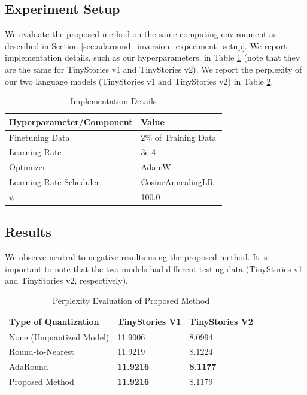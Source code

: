 \documentclass[../main.tex]{subfiles}
\begin{document}
\subsection{Experiment Setup}
We evaluate the proposed method on the same computing environment as described in Section \ref{sec:adaround_inversion_experiment_setup}. We report implementation details, such as our hyperparameters, in Table \ref{tab:implementation_detail_2} (note that they are the same for TinyStories v1 and TinyStories v2). We report the perplexity of our two language models (TinyStories v1 and TinyStories v2) in Table \ref{tab:gradient_aware_adaround_results}. 

\begin{table}[H]
\centering
\caption{Implementation Details}
\label{tab:implementation_detail_2}
\begin{tabular}{ll}
\hline
\textbf{Hyperparameter/Component} & \textbf{Value} \\ \hline
Finetuning Data & $2\%$ of Training Data \\
Learning Rate & 3e-4 \\
Optimizer & AdamW~\cite{loshchilovDecoupledWeightDecay2019} \\
Learning Rate Scheduler & CosineAnnealingLR~\cite{loshchilovSGDRStochasticGradient2017} \\
$\psi$ & 100.0 \\
\hline
\end{tabular}
\end{table}

\subsection{Results}
We observe neutral to negative results using the proposed method. It is important to note that the two models had different testing data (TinyStories v1 and TinyStories v2, respectively).

\begin{table}[H]
\centering
\caption{Perplexity Evaluation of Proposed Method}
\label{tab:gradient_aware_adaround_results}
\begin{tabular}{|l|l|l|}
\hline
Type of Quantization & TinyStories V1   & TinyStories V2  \\ \hline
None (Unquantized Model)          & 11.9006          & 8.0994          \\ \hline \hline
Round-to-Nearest     & 11.9219          & 8.1224          \\ \hline
AdaRound             & \textbf{11.9216}          & \textbf{8.1177} \\ \hline
Proposed Method      & \textbf{11.9216} & 8.1179          \\ \hline
\end{tabular}
\end{table}
\end{document}
